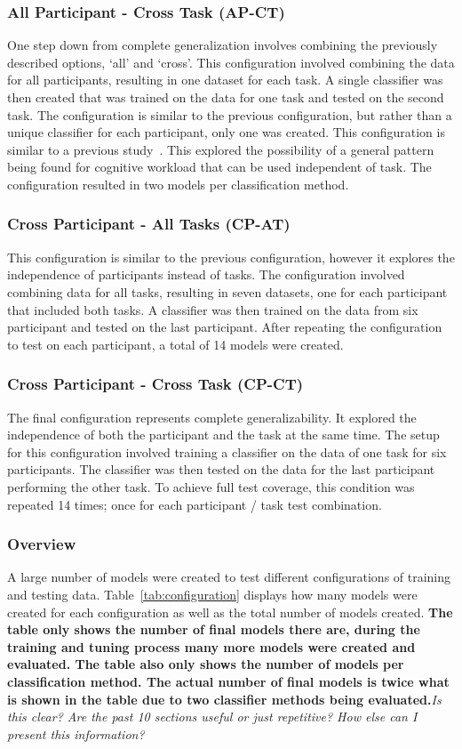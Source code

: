\documentclass[11pt]{article}
\begin{document}
		\subsubsection{All Participant - Cross Task (AP-CT)}
		One step down from complete generalization involves combining the previously described options, `all' and `cross'. This configuration involved combining the data for all participants, resulting in one dataset for each task. A single classifier was then created that was trained on the data for one task and tested on the second task. The configuration is similar to the previous configuration, but rather than a unique classifier for each participant, only one was created. This configuration is similar to a previous study~\cite{}. This explored the possibility of a general pattern being found for cognitive workload that can be used independent of task. The configuration resulted in two models per classification method.
		
		\subsubsection{Cross Participant - All Tasks (CP-AT)}
		This configuration is similar to the previous configuration, however it explores the independence of participants instead of tasks. The configuration involved combining data for all tasks, resulting in seven datasets, one for each participant that included both tasks. A classifier was then trained on the data from six participant and tested on the last participant. After repeating the configuration to test on each participant, a total of 14 models were created.
		
		\subsubsection{Cross Participant - Cross Task (CP-CT)}
		The final configuration represents complete generalizability. It explored the independence of both the participant and the task at the same time. The setup for this configuration involved training a classifier on the data of one task for six participants. The classifier was then tested on the data for the last participant performing the other task. To achieve full test coverage, this condition was repeated 14 times; once for each participant / task test combination.
		
		\subsubsection{Overview}
		A large number of models were created to test different configurations of training and testing data. Table~\ref{tab:configuration} displays how many models were created for each configuration as well as the total number of models created. {\bf The table only shows the number of final models there are, during the training and tuning process many more models were created and evaluated. The table also only shows the number of models per classification method. The actual number of final models is twice what is shown in the table due to two classifier methods being evaluated.}\emph{Is this clear? Are the past 10 sections useful or just repetitive? How else can I present this information?}
		
\end{document}
